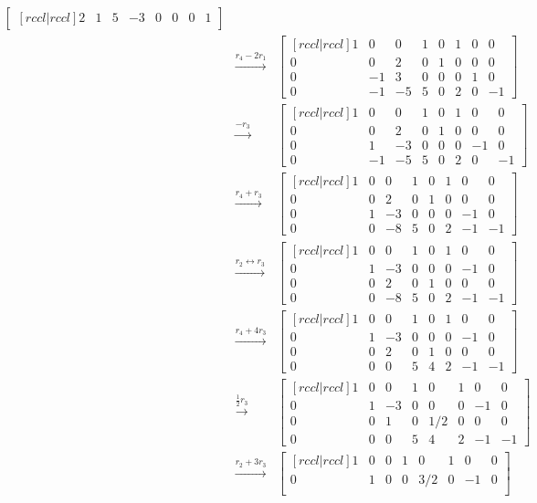 \begin{solution}
\begin{eqnarray*}
\begin{bmatrix}[rccl|rccl]
2&1&5&-3&0&0&0&1
\end{bmatrix}\\
&\xrightarrow[]{r_4-2r_1}&
\begin{bmatrix}[rccl|rccl]
1&0&0&1&0&1&0&0\\
0&0&2&0&1&0&0&0\\
0&-1&3&0&0&0&1&0\\
0&-1&-5&5&0&2&0&-1
\end{bmatrix}\\
&\xrightarrow[]{-r_3}&
\begin{bmatrix}[rccl|rccl]
1&0&0&1&0&1&0&0\\
0&0&2&0&1&0&0&0\\
0&1&-3&0&0&0&-1&0\\
0&-1&-5&5&0&2&0&-1
\end{bmatrix}\\
&\xrightarrow[]{r_4+r_3}&
\begin{bmatrix}[rccl|rccl]
1&0&0&1&0&1&0&0\\
0&0&2&0&1&0&0&0\\
0&1&-3&0&0&0&-1&0\\
0&0&-8&5&0&2&-1&-1
\end{bmatrix}\\
&\xrightarrow[]{r_2 \leftrightarrow r_3}&
\begin{bmatrix}[rccl|rccl]
1&0&0&1&0&1&0&0\\
0&1&-3&0&0&0&-1&0\\
0&0&2&0&1&0&0&0\\
0&0&-8&5&0&2&-1&-1
\end{bmatrix}\\
&\xrightarrow[]{r_4+4r_3}&
\begin{bmatrix}[rccl|rccl]
1&0&0&1&0&1&0&0\\
0&1&-3&0&0&0&-1&0\\
0&0&2&0&1&0&0&0\\
0&0&0&5&4&2&-1&-1
\end{bmatrix}\\
&\xrightarrow[]{\frac{1}{2}r_3}&
\begin{bmatrix}[rccl|rccl]
1&0&0&1&0&1&0&0\\
0&1&-3&0&0&0&-1&0\\
0&0&1&0&1/2&0&0&0\\
0&0&0&5&4&2&-1&-1
\end{bmatrix}\\
&\xrightarrow[]{r_2 + 3r_3}&
\begin{bmatrix}[rccl|rccl]
1&0&0&1&0&1&0&0\\
0&1&0&0&3/2&0&-1&0\\

\end{bmatrix}
\end{eqnarray*}
\end{solution}
